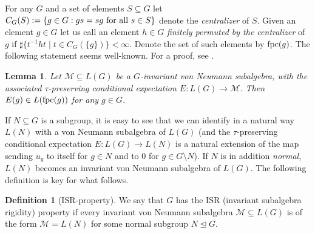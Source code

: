 \documentclass[11pt]{amsart}
\newcommand{\fpc}{{\rm fpc}}
\theoremstyle{plain}
\newtheorem{lemma}[theorem]{Lemma}
\theoremstyle{definition}
\newtheorem{definition}[theorem]{Definition}
\theoremstyle{remark}
\numberwithin{equation}{section}
\begin{document}
For any $G$ and a set of elements $S\subseteq G$ let $C_G(S):=\{ g \in G: gs = sg \textup{ for all } s \in S\}$ denote the \emph{centralizer} of $S$. Given an element $g\in G$ let us call an element $h\in G$ \emph{finitely permuted by the centralizer} of $g$ if $\sharp\{t^{-1}ht\mid t\in C_G(\{g\})\}<\infty$. Denote the set of such elements by $\fpc(g)$. The following statement seems well-known. For a proof, see \cite[Lemma~4.6]{dudko2024character}.
\begin{lemma}\label{lemma: fpc application} Let $\mathcal M\subseteq L(G)$ be a $G$-invariant von Neumann subalgebra, with the associated $\tau$-preserving conditional expectation $E: L(G)\rightarrow \mathcal M$. Then  $E(g)\in L(\fpc(g))$ for any $g\in G$.
\end{lemma}
If $N\subseteq G$ is a subgroup, it is easy to see that we can identify in a natural way $L(N)$ with a von Neumann subalgebra of $L(G)$ (and the $\tau$-preserving conditional expectation $E:L(G) \to L(N)$ is a natural extension of the map sending $u_g$ to itself for $g \in N$ and to $0$ for $g \in G \setminus N$). If $N$ is in addition \emph{normal}, $L(N)$ becomes an invariant von Neumann subalgebra of $L(G)$. The following definition is key for what follows.
\begin{definition}[ISR-property]
	We say that $G$ has the ISR (invariant subalgebra rigidity) property if every invariant von Neumann subalgebra $\mathcal M \subseteq L(G)$ is of the form $\mathcal M = L(N)$ for some normal subgroup $N \trianglelefteq G$.
\end{definition}
\end{document}
